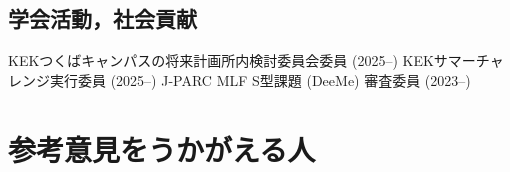 \documentclass[11pt,a4paper,uplatex,dvipdfmx]{ujarticle} 		%
\newcommand{\研究課題名}{象の卵}
\newcommand{\研究機関名}{東京大学}
\newcommand{\研究代表者氏名}{内山雄祐}
\newcommand{\研究期間の最終元号年度}{6}  %
\begin{document}
\subsection{学会活動，社会貢献}
\begin{enumerate}
\setcounter{enumi}{70}
	\setlength{\itemsep}{-1pt}

 KEKつくばキャンパスの将来計画所内検討委員会委員 (2025--)
 KEKサマーチャレンジ実行委員 (2025--)
 J-PARC MLF S型課題 (DeeMe) 審査委員 (2023--)
\end{enumerate}

\newpage

\section{参考意見をうかがえる人}
\end{document}
